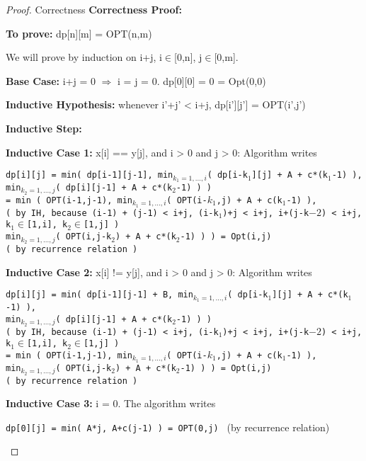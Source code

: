 \documentclass[openany]{article}
\begin{document}
\begin{proof}{Correctness}
    \textbf{Correctness Proof:}
    
    \textbf{To prove:} dp[n][m] = OPT(n,m)
    
    We will prove by induction on i+j, i$\in$[0,n], j$\in$[0,m].
    
    \textbf{Base Case:} i+j = 0 $\Rightarrow$ i = j = 0. dp[0][0] = 0 = Opt(0,0)
    
    \textbf{Inductive Hypothesis:} whenever i'+j' < i+j, dp[i'][j'] = OPT(i',j')
    
    \textbf{Inductive Step:}
    
    \textbf{Inductive Case 1:}  x[i] == y[j], and i > 0 and j > 0:
    Algorithm writes 
    \begin{center}
        \texttt{dp[i][j] = min( dp[i-1][j-1], min$_{k_1=1,...,i}$( dp[i-k$_1$][j] + A + c*(k$_1$-1) ),\\min$_{k_2=1,...,j}$( dp[i][j-1] + A + c*(k$_2$-1) ) )\\
        = min ( OPT(i-1,j-1), min$_{k_1=1,...,i}$( OPT(i-$k_1$,j) + A + c(k$_1$-1) ), \\( by IH, because (i-1) + (j-1) < i+j, (i-k$_1$)+j < i+j, i+(j-k$-2$) < i+j, k$_1$$\in$[1,i], k$_2$$\in$[1,j] ) \\min$_{k_2=1,...,j}$( OPT(i,j-k$_2$) + A + c*(k$_2$-1) ) ) = Opt(i,j) \\( by recurrence relation )}
    \end{center}

    \textbf{Inductive Case 2:}  x[i] != y[j], and i > 0 and j > 0:
    Algorithm writes 
    \begin{center}
        \texttt{dp[i][j] = min( dp[i-1][j-1] + B, min$_{k_1=1,...,i}$( dp[i-k$_1$][j] + A + c*(k$_1$-1) ),\\min$_{k_2=1,...,j}$( dp[i][j-1] + A + c*(k$_2$-1) ) ) \\( by IH, because (i-1) + (j-1) < i+j, (i-k$_1$)+j < i+j, i+(j-k$-2$) < i+j, k$_1$$\in$[1,i], k$_2$$\in$[1,j] )\\
= min ( OPT(i-1,j-1), min$_{k_1=1,...,i}$( OPT(i-$k_1$,j) + A + c(k$_1$-1) ), \\min$_{k_2=1,...,j}$( OPT(i,j-k$_2$) + A + c*(k$_2$-1) ) ) = Opt(i,j) \\( by recurrence relation ) }
    \end{center}

    \textbf{Inductive Case 3:} i = 0. The algorithm writes 
    \begin{center}
        \texttt{dp[0][j] = min( A*j, A+c(j-1) ) = OPT(0,j) } (by recurrence relation)
    \end{center}
    

\end{proof}
\end{document}
